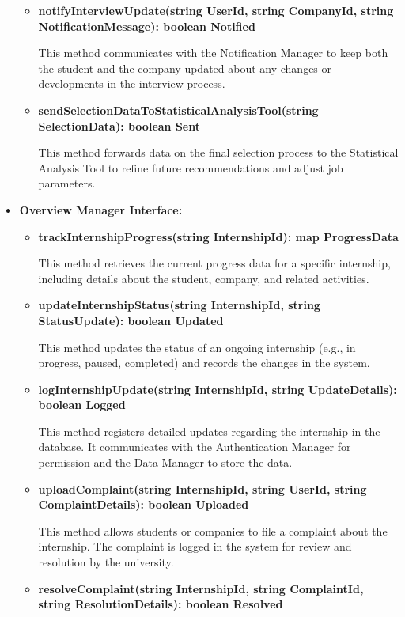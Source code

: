 \begin{itemize}
\begin{itemize}
    \item \textbf{notifyInterviewUpdate(string UserId, string CompanyId, string NotificationMessage): boolean Notified}

    This method communicates with the Notification Manager to keep both the student and the company updated about any changes or developments in the interview process.

    \item \textbf{sendSelectionDataToStatisticalAnalysisTool(string SelectionData): boolean Sent}

    This method forwards data on the final selection process to the Statistical Analysis Tool to refine future recommendations and adjust job parameters.
    \end{itemize}



\item \textbf{Overview Manager Interface:}
\begin{itemize}
    \item \textbf{trackInternshipProgress(string InternshipId): map ProgressData}

    This method retrieves the current progress data for a specific internship, including details about the student, company, and related activities.

    \item \textbf{updateInternshipStatus(string InternshipId, string StatusUpdate): boolean Updated}

    This method updates the status of an ongoing internship (e.g., in progress, paused, completed) and records the changes in the system.

    \item \textbf{logInternshipUpdate(string InternshipId, string UpdateDetails): boolean Logged}

    This method registers detailed updates regarding the internship in the database. It communicates with the Authentication Manager for permission and the Data Manager to store the data.

    \item \textbf{uploadComplaint(string InternshipId, string UserId, string ComplaintDetails): boolean Uploaded}

    This method allows students or companies to file a complaint about the internship. The complaint is logged in the system for review and resolution by the university.

    \item \textbf{resolveComplaint(string InternshipId, string ComplaintId, string ResolutionDetails): boolean Resolved}


\end{itemize}
\end{itemize}

